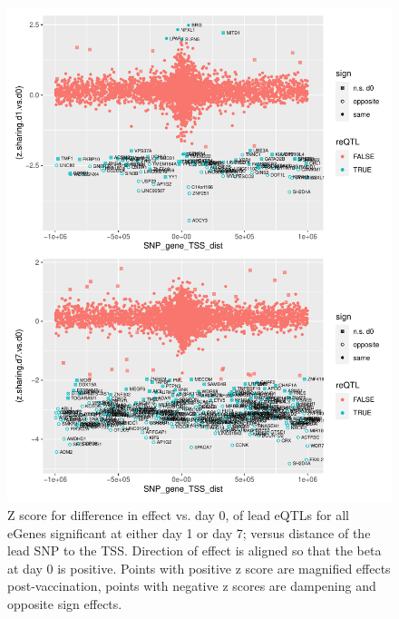 \begin{figure}
    \centering
    \includegraphics[width=1.0\textwidth]{mainmatter/figures/chapter_03/compare_dge_eqtl.z_sharing.vs.SNP_gene_TSS_dist.pdf}
    \caption{
        Z score for difference in effect vs. day 0, of lead eQTLs for all eGenes significant at either day 1 or day 7;
        versus distance of the lead SNP to the TSS.
        Direction of effect is aligned so that the beta at day 0 is positive. 
        Points with positive z score are magnified effects post-vaccination, points with negative z scores are dampening and opposite sign effects.
    }
    \label{fig:hird_eQTL_zSharing_vs_TSSdist_mega}
\end{figure}

